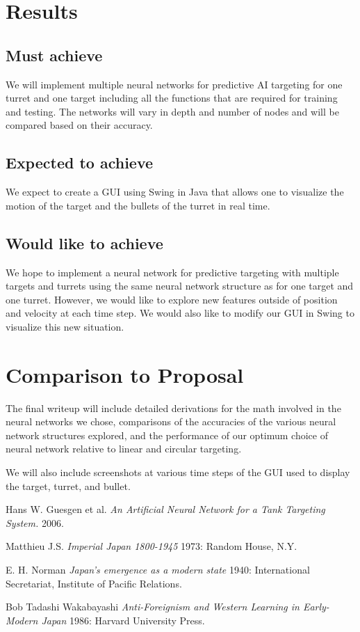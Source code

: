 \documentclass[11pt]{article}
\begin{document}
\section{Results}
\subsection{Must achieve}

We will implement multiple neural networks for predictive AI targeting for one turret and one target including all the functions that are required for training and testing. The networks will vary in depth and number of nodes and will be compared based on their accuracy.

\subsection{Expected to achieve}

We expect to create a GUI using Swing in Java that allows one to visualize the motion of the target and the bullets of the turret in real time.

\subsection{Would like to achieve}

We hope to implement a neural network for predictive targeting with multiple targets and turrets using the same neural network structure as for one target and one turret. However, we would like to explore new features outside of position and velocity at each time step. We would also like to modify our GUI in Swing to visualize this new situation.

\section{Comparison to Proposal}

The final writeup will include detailed derivations for the math involved in the neural networks we chose, comparisons of the accuracies of the various neural network structures explored, and the performance of our optimum choice of neural network relative to linear and circular targeting.

We will also include screenshots at various time steps of the GUI used to display the target, turret, and bullet.

\begin{thebibliography}{1}
 Hans W. Guesgen et al. {\em An Artificial Neural Network 
for a Tank Targeting System.}  2006.

 Matthieu J.S.  {\em Imperial Japan 1800-1945} 1973:
Random House, N.Y.

 E. H. Norman {\em Japan's emergence as a modern
state} 1940: International Secretariat, Institute of Pacific
Relations.

 Bob Tadashi Wakabayashi {\em Anti-Foreignism and Western
Learning in Early-Modern Japan} 1986: Harvard University Press.

\end{thebibliography}
\end{document}
